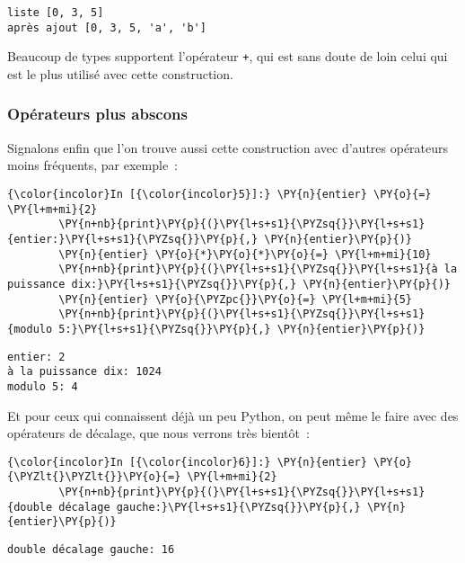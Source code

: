     \begin{Verbatim}[commandchars=\\\{\}]
liste [0, 3, 5]
après ajout [0, 3, 5, 'a', 'b']

    \end{Verbatim}

    Beaucoup de types supportent l'opérateur \texttt{+}, qui est sans doute
de loin celui qui est le plus utilisé avec cette construction.

    \hypertarget{opuxe9rateurs-plus-abscons}{%
\subsubsection{Opérateurs plus
abscons}\label{opuxe9rateurs-plus-abscons}}

    Signalons enfin que l'on trouve aussi cette construction avec d'autres
opérateurs moins fréquents, par exemple~:

    \begin{Verbatim}[commandchars=\\\{\}]
{\color{incolor}In [{\color{incolor}5}]:} \PY{n}{entier} \PY{o}{=} \PY{l+m+mi}{2}
        \PY{n+nb}{print}\PY{p}{(}\PY{l+s+s1}{\PYZsq{}}\PY{l+s+s1}{entier:}\PY{l+s+s1}{\PYZsq{}}\PY{p}{,} \PY{n}{entier}\PY{p}{)}
        \PY{n}{entier} \PY{o}{*}\PY{o}{*}\PY{o}{=} \PY{l+m+mi}{10}
        \PY{n+nb}{print}\PY{p}{(}\PY{l+s+s1}{\PYZsq{}}\PY{l+s+s1}{à la puissance dix:}\PY{l+s+s1}{\PYZsq{}}\PY{p}{,} \PY{n}{entier}\PY{p}{)}
        \PY{n}{entier} \PY{o}{\PYZpc{}}\PY{o}{=} \PY{l+m+mi}{5}
        \PY{n+nb}{print}\PY{p}{(}\PY{l+s+s1}{\PYZsq{}}\PY{l+s+s1}{modulo 5:}\PY{l+s+s1}{\PYZsq{}}\PY{p}{,} \PY{n}{entier}\PY{p}{)}
\end{Verbatim}


    \begin{Verbatim}[commandchars=\\\{\}]
entier: 2
à la puissance dix: 1024
modulo 5: 4

    \end{Verbatim}

    Et pour ceux qui connaissent déjà un peu Python, on peut même le faire
avec des opérateurs de décalage, que nous verrons très bientôt~:

    \begin{Verbatim}[commandchars=\\\{\}]
{\color{incolor}In [{\color{incolor}6}]:} \PY{n}{entier} \PY{o}{\PYZlt{}\PYZlt{}}\PY{o}{=} \PY{l+m+mi}{2}
        \PY{n+nb}{print}\PY{p}{(}\PY{l+s+s1}{\PYZsq{}}\PY{l+s+s1}{double décalage gauche:}\PY{l+s+s1}{\PYZsq{}}\PY{p}{,} \PY{n}{entier}\PY{p}{)}
\end{Verbatim}


    \begin{Verbatim}[commandchars=\\\{\}]
double décalage gauche: 16

    \end{Verbatim}


    
    
    
